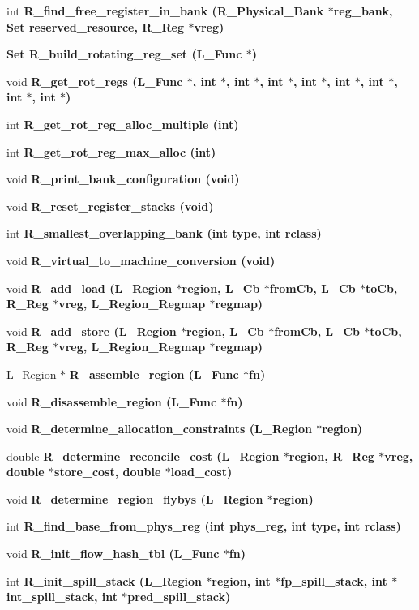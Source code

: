 \begin{CompactItemize}
int \bf{R\_\-find\_\-free\_\-register\_\-in\_\-bank} (\bf{R\_\-Physical\_\-Bank} $\ast$reg\_\-bank, \bf{Set} reserved\_\-resource, \bf{R\_\-Reg} $\ast$vreg)
\item 
\bf{Set} \bf{R\_\-build\_\-rotating\_\-reg\_\-set} (L\_\-Func $\ast$)
\item 
void \bf{R\_\-get\_\-rot\_\-regs} (L\_\-Func $\ast$, int $\ast$, int $\ast$, int $\ast$, int $\ast$, int $\ast$, int $\ast$, int $\ast$, int $\ast$)
\item 
int \bf{R\_\-get\_\-rot\_\-reg\_\-alloc\_\-multiple} (int)
\item 
int \bf{R\_\-get\_\-rot\_\-reg\_\-max\_\-alloc} (int)
\item 
void \bf{R\_\-print\_\-bank\_\-configuration} (void)
\item 
void \bf{R\_\-reset\_\-register\_\-stacks} (void)
\item 
int \bf{R\_\-smallest\_\-overlapping\_\-bank} (int type, int rclass)
\item 
void \bf{R\_\-virtual\_\-to\_\-machine\_\-conversion} (void)
\item 
void \bf{R\_\-add\_\-load} (L\_\-Region $\ast$\bf{region}, L\_\-Cb $\ast$from\-Cb, L\_\-Cb $\ast$to\-Cb, \bf{R\_\-Reg} $\ast$vreg, L\_\-Region\_\-Regmap $\ast$regmap)
\item 
void \bf{R\_\-add\_\-store} (L\_\-Region $\ast$\bf{region}, L\_\-Cb $\ast$from\-Cb, L\_\-Cb $\ast$to\-Cb, \bf{R\_\-Reg} $\ast$vreg, L\_\-Region\_\-Regmap $\ast$regmap)
\item 
L\_\-Region $\ast$ \bf{R\_\-assemble\_\-region} (L\_\-Func $\ast$fn)
\item 
void \bf{R\_\-disassemble\_\-region} (L\_\-Func $\ast$fn)
\item 
void \bf{R\_\-determine\_\-allocation\_\-constraints} (L\_\-Region $\ast$\bf{region})
\item 
double \bf{R\_\-determine\_\-reconcile\_\-cost} (L\_\-Region $\ast$\bf{region}, \bf{R\_\-Reg} $\ast$vreg, double $\ast$store\_\-cost, double $\ast$load\_\-cost)
\item 
void \bf{R\_\-determine\_\-region\_\-flybys} (L\_\-Region $\ast$\bf{region})
\item 
int \bf{R\_\-find\_\-base\_\-from\_\-phys\_\-reg} (int phys\_\-reg, int type, int rclass)
\item 
void \bf{R\_\-init\_\-flow\_\-hash\_\-tbl} (L\_\-Func $\ast$fn)
\item 
int \bf{R\_\-init\_\-spill\_\-stack} (L\_\-Region $\ast$\bf{region}, int $\ast$\bf{fp\_\-spill\_\-stack}, int $\ast$\bf{int\_\-spill\_\-stack}, int $\ast$\bf{pred\_\-spill\_\-stack})

\end{CompactItemize}
